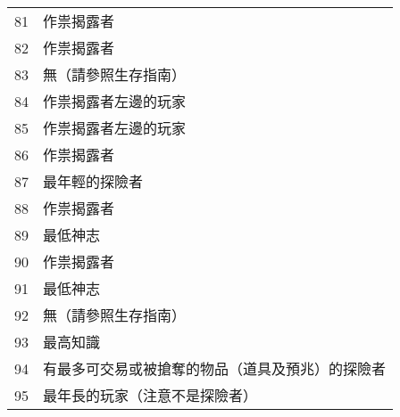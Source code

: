 \begin{center}
\begin{minipage}[t]{.45\textwidth}
\begin{tabular}[t]{ c l }
			81             & 作祟揭露者                                                                                                                               \\
			82             & 作祟揭露者                                                                                                                               \\
			83             & 無（請參照生存指南）                                                                                                                          \\
			84             & 作祟揭露者左邊的玩家                                                                                                                          \\
			85             & 作祟揭露者左邊的玩家                                                                                                                          \\

			86             & 作祟揭露者                                                                                                                               \\
			87             & 最年輕的探險者                                                                                                                             \\
			88             & 作祟揭露者                                                                                                                               \\
			89             & 最低神志                                                                                                                                \\
			90             & 作祟揭露者                                                                                                                               \\

			91             & 最低神志                                                                                                                                \\
			92             & 無（請參照生存指南）                                                                                                                          \\
			93             & 最高知識                                                                                                                                \\
			94             & \begin{minipage}[t]{15em}有最多可交易或被搶奪的物品（道具及預兆）的探險者\end{minipage}                                                                     \\
			95             & 最年長的玩家（注意不是探險者）                                                                                                                     \\


\end{tabular}
\end{minipage}
\end{center}
